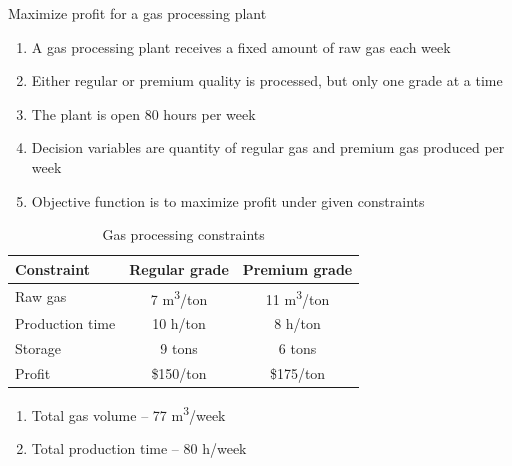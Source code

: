 \documentclass[aspectratio=1610,pdftex,dvipsnames,compress,xcolor={dvipsnames}]{beamer}
\begin{document}
\addtocounter{framenumber}{-1} 
\begin{frame}{Maximize profit for a gas processing plant}
    \begin{enumerate}[series=outerlist,topsep=0pt,itemsep=21pt,leftmargin=*,label=(\arabic*)]
        \item[]A gas processing plant receives a fixed amount of raw gas each week
        \item[]Either regular or premium quality is processed, but only one grade at a time
        \item[]The plant is open 80 hours per week
        \item[]Decision variables are quantity of regular gas and premium gas produced per week
        \item[]Objective function is to maximize profit under given constraints
    \end{enumerate}
\end{frame}


\begin{frame}{}
    \setlength{\arrayrulewidth}{0.3mm}
    \begin{longtable}{l|c|c}
        \caption{Gas processing constraints}
        \label{tab-gas-processing}
        \\
        \textbf{Constraint}
        &\textbf{Regular grade}
        &\textbf{Premium grade}
        \\
        \hline
        Raw gas
        & 7 m\textsuperscript{3}/ton
        & 11 m\textsuperscript{3}/ton
        \\
        Production time
        & 10 h/ton
        & 8 h/ton
        \\
        Storage
        & 9 tons
        & 6 tons
        \\
        Profit
        & \$150/ton
        & \$175/ton
        \\
    \end{longtable}
    
    \begin{enumerate}[series=outerlist,topsep=0pt,itemsep=21pt,leftmargin=*,label=(\arabic*)]
        \item[]Total gas volume  -- 77 m\textsuperscript{3}/week
        \item[]Total production time -- 80 h/week
    \end{enumerate}
\end{frame}
\end{document}
